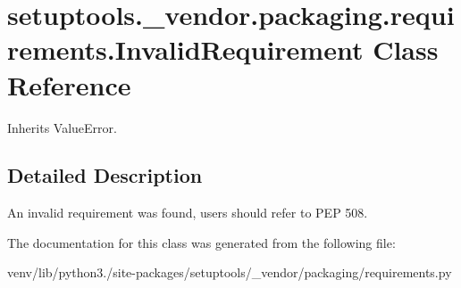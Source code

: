 \hypertarget{classsetuptools_1_1__vendor_1_1packaging_1_1requirements_1_1_invalid_requirement}{}\section{setuptools.\+\_\+vendor.\+packaging.\+requirements.\+Invalid\+Requirement Class Reference}
\label{classsetuptools_1_1__vendor_1_1packaging_1_1requirements_1_1_invalid_requirement}


Inherits Value\+Error.



\subsection{Detailed Description}
\begin{DoxyVerb}An invalid requirement was found, users should refer to PEP 508.
\end{DoxyVerb}
 

The documentation for this class was generated from the following file\+:\begin{DoxyCompactItemize}
\item 
venv/lib/python3./site-\/packages/setuptools/\+\_\+vendor/packaging/requirements.\+py\end{DoxyCompactItemize}
